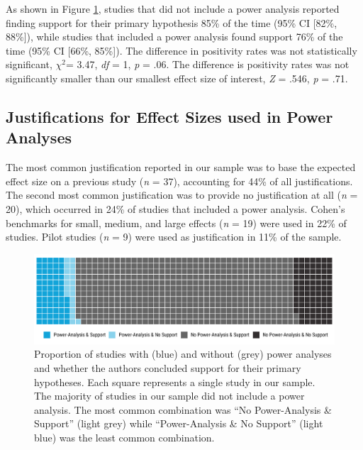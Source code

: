 \documentclass[
  doc, donotrepeattitle,floatsintext]{apa7}
\begin{document}
As shown in Figure \ref{fig:fig2}, studies that did not include a power analysis reported finding support for their primary hypothesis 85\% of the time (95\% CI {[}82\%, 88\%{]}), while studies that included a power analysis found support 76\% of the time (95\% CI {[}66\%, 85\%{]}). The difference in positivity rates was not statistically significant, \(\chi^2\)= 3.47, \emph{df} = 1, \emph{p} = .06. The difference is positivity rates was not significantly smaller than our smallest effect size of interest, \emph{Z} = .546, \emph{p} = .71.

\hypertarget{justifications-for-effect-sizes-used-in-power-analyses}{%
\subsection{Justifications for Effect Sizes used in Power Analyses}\label{justifications-for-effect-sizes-used-in-power-analyses}}

The most common justification reported in our sample was to base the expected effect size on a previous study (\emph{n} = 37), accounting for 44\% of all justifications. The second most common justification was to provide no justification at all (\emph{n} = 20), which occurred in 24\% of studies that included a power analysis. Cohen's benchmarks for small, medium, and large effects (\emph{n} = 19) were used in 22\% of studies. Pilot studies (\emph{n} = 9) were used as justification in 11\% of the sample.

\pagebreak

\begin{figure}

{\centering \includegraphics{../../figs/fig2} 

}

\caption{Proportion of studies with (blue) and without (grey) power analyses and whether the authors concluded support for their primary hypotheses. Each square represents a single study in our sample. The majority of studies in our sample did not include a power analysis. The most common combination was ``No Power-Analysis \& Support'' (light grey) while ``Power-Analysis \& No Support'' (light blue) was the least common combination.}\label{fig:fig2}
\end{figure}
\end{document}

